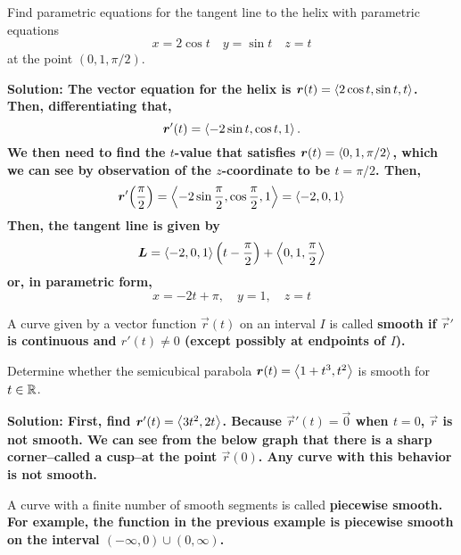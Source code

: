 \begin{example}
    Find parametric equations for the tangent line to the helix with parametric equations 
    \[ x=2\cos t\quad y=\sin t\quad z=t \]
    at the point \((0, 1, \pi/2)\).\par\bf{Solution: }The vector equation for the helix is \(\boldsymbol{r}(t)=\left\langle2\cos t, \sin t, t\right\rangle\). Then, differentiating that, \[ \boldsymbol{r}'(t) = \left\langle-2\sin t, \cos t, 1\right\rangle. \]
    We then need to find the \(t\)-value that satisfies \(\boldsymbol{r}(t) = \left\langle0, 1, \pi/2\right\rangle\), which we can see by observation of the \(z\)-coordinate to be \(t=\pi/2\). Then,
    \[ \vec r'\pqty{\frac{\pi}2} = \<-2\sin\frac{\pi}2, \cos \frac{\pi}2, 1\> = \<-2, 0, 1\> \]
    Then, the tangent line is given by
    \[ \vec L = \<-2, 0, 1\>\pqty{t - \frac{\pi}2}+\<0, 1, \frac{\pi}2\> \]
    or, in parametric form,
    \[ x = -2t + \pi, \quad y = 1, \quad z = t\]
\end{example}
A curve given by a vector function \(\vec r(t)\) on an interval \(I\) is called \bf{smooth} if \(\vec r'\) is continuous and \(r'(t)\neq 0\) (except possibly at endpoints of \(I\)). 
\begin{example}
    Determine whether the semicubical parabola \(\boldsymbol{r}(t)=\left\langle1+t^3, t^2\right\rangle\) is smooth for \(t\in \mathbb{R}\). \par\bf{Solution: } First, find \(\boldsymbol{r}'(t) = \left\langle3t^2, 2t\right\rangle\). Because \(\vec r'(t) = \vec 0\) when \(t=0\), \(\vec r\) is not smooth. We can see from the below graph that there is a sharp corner--called a \bf{cusp}--at the point \(\vec r(0)\). Any curve with this behavior is not smooth.
\end{example}
A curve with a finite number of smooth segments is called \bf{piecewise smooth}. For example, the function in the previous example is piecewise smooth on the interval \((-\infty, 0)\cup(0, \infty)\).
